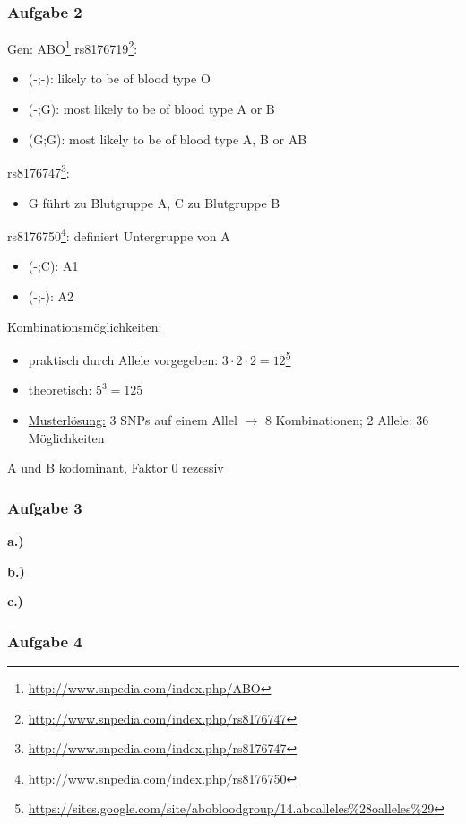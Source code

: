 \subsubsection{Aufgabe 2}
Gen: ABO\footnote{\url{http://www.snpedia.com/index.php/ABO}}
rs8176719\footnote{\url{http://www.snpedia.com/index.php/rs8176747}}:
\begin{itemize}
	\item (-;-): likely to be of blood type O
	\item (-;G): most likely to be of blood type A or B
	\item (G;G): most likely to be of blood type A, B or AB 
\end{itemize}

rs8176747\footnote{\url{http://www.snpedia.com/index.php/rs8176747}}:
\begin{itemize}
	\item G führt zu Blutgruppe A, C zu Blutgruppe B
\end{itemize}

rs8176750\footnote{\url{http://www.snpedia.com/index.php/rs8176750}}: definiert Untergruppe von A
\begin{itemize}
	\item (-;C): A1
	\item (-;-): A2
\end{itemize}

Kombinationsmöglichkeiten:
\begin{itemize}
	\item praktisch durch Allele vorgegeben: $3 \cdot 2 \cdot 2 = 12$\footnote{\url{https://sites.google.com/site/abobloodgroup/14.aboalleles\%28oalleles\%29}}
	\item theoretisch: $5^3=125$
	\item \underline{Musterlösung:} 3 SNPs auf einem Allel $\rightarrow$ 8 Kombinationen; 2 Allele: 36 Möglichkeiten
\end{itemize}

A und B kodominant, Faktor 0 rezessiv

\subsubsection{Aufgabe 3}

\textbf{a.)}

\textbf{b.)}

\textbf{c.)}

\subsubsection{Aufgabe 4}

